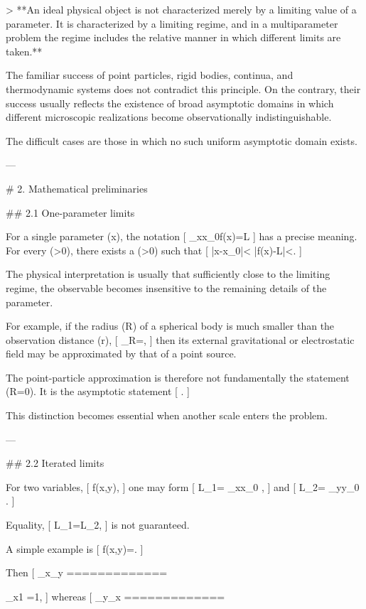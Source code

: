 > **An ideal physical object is not characterized merely by a limiting value of a parameter. It is characterized by a limiting regime, and in a multiparameter problem the regime includes the relative manner in which different limits are taken.**

The familiar success of point particles, rigid bodies, continua, and thermodynamic systems does not contradict this principle. On the contrary, their success usually reflects the existence of broad asymptotic domains in which different microscopic realizations become observationally indistinguishable.

The difficult cases are those in which no such uniform asymptotic domain exists.

---

# 2. Mathematical preliminaries

## 2.1 One-parameter limits

For a single parameter (x), the notation
[
\lim_{x\to x_0}f(x)=L
]
has a precise meaning. For every (\epsilon>0), there exists a (\delta>0) such that
[
|x-x_0|<\delta
\quad\Longrightarrow\quad
|f(x)-L|<\epsilon.
]

The physical interpretation is usually that sufficiently close to the limiting regime, the observable becomes insensitive to the remaining details of the parameter.

For example, if the radius (R) of a spherical body is much smaller than the observation distance (r),
[
\epsilon_R=,
]
then its external gravitational or electrostatic field may be approximated by that of a point source.

The point-particle approximation is therefore not fundamentally the statement (R=0). It is the asymptotic statement
[
.
]

This distinction becomes essential when another scale enters the problem.

---

## 2.2 Iterated limits

For two variables,
[
f(x,y),
]
one may form
[
L_1=
\lim_{x\to x_0}
,
]
and
[
L_2=
\lim_{y\to y_0}
.
]

Equality,
[
L_1=L_2,
]
is not guaranteed.

A simple example is
[
f(x,y)=.
]

Then
[
\lim_{x}\lim_{y}
=============

\lim_{x}1
=1,
]
whereas
[
\lim_{y}\lim_{x}
=============

